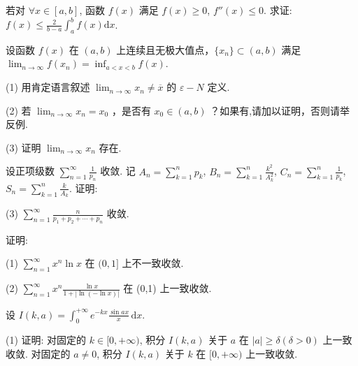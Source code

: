 若对 $\forall x \in [a, b]$, 函数 $f(x)$ 满足 $f(x) \geq 0$, $f''(x) \leq 0$. 求证: $f(x) \leq \frac{2}{b - a} \int_{a}^{b} f(x) \mathrm{d}x$.\par
设函数 $f(x)$ 在 $(a, b)$ 上连续且无极大值点，$\{x_n\} \subset (a, b)$ 满足 $\lim_{n \to \infty} f(x_n) = \inf_{a < x < b} f(x)$.\par
(1) 用肯定语言叙述 $\lim_{n\to \infty}x_n\neq \overline{x}$ 的 $\varepsilon -N$ 定义.\par
(2) 若 $\lim_{n\to \infty}x_n = x_0$ ，是否有 $x_0\in (a,b)$ ？如果有,请加以证明，否则请举反例.\par
(3) 证明 $\lim_{n\to \infty}x_n$ 存在.\par
\par{}
设正项级数 $\sum_{n=1}^{\infty} \frac{1}{p_n}$ 收敛. 记 $A_n = \sum_{k=1}^{n} p_k$, $B_n = \sum_{k=1}^{n} \frac{k^2}{A_k^2}$, $C_n = \sum_{k=1}^{n} \frac{1}{p_k}$, $S_n = \sum_{k=1}^{n} \frac{k}{A_k}$. 证明:\par
\nopagebreak[4]
(3) $\sum_{n=1}^{\infty} \frac{n}{p_1 + p_2 + \cdots + p_n}$ 收敛.\par
证明:\par
(1) $\sum_{n=1}^{\infty} x^{n} \ln x$ 在 $(0,1]$ 上不一致收敛.\par
(2) $\sum_{n=1}^{\infty} x^n \frac{\ln x}{1 + |\ln(-\ln x)|}$ 在 (0,1) 上一致收敛.\par
设 $I(k, a) = \int_{0}^{+\infty} e^{-kx} \frac{\sin ax}{x} \, \mathrm{d}x$.\par
(1) 证明: 对固定的 $k \in [0, +\infty)$, 积分 $I(k, a)$ 关于 $a$ 在 $|a| \geq \delta (\delta > 0)$ 上一致收敛. 对固定的 $a \neq 0$, 积分 $I(k, a)$ 关于 $k$ 在 $[0, +\infty)$ 上一致收敛.\par

